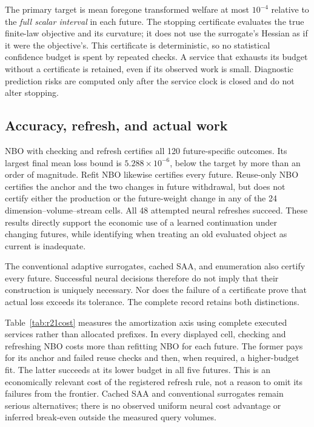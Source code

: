 The primary target is mean foregone transformed welfare at most $10^{-4}$
relative to the \emph{full scalar interval} in each future. The stopping
certificate evaluates the true finite-law objective and its curvature;
it does not use the surrogate's Hessian as if it were the objective's.
This certificate is deterministic, so no statistical confidence budget is
spent by repeated checks. A service that exhausts its budget without a
certificate is retained, even if its observed work is small. Diagnostic
prediction risks are computed only after the service clock is closed and
do not alter stopping.

\subsection{Accuracy, refresh, and actual work}

NBO with checking and refresh certifies all 120 future-specific outcomes.
Its largest final mean loss bound is $5.288\times10^{-6}$, below the target
by more than an order of magnitude. Refit NBO likewise certifies every
future. Reuse-only NBO certifies the anchor and the two changes in future
withdrawal, but does not certify either the production or the future-weight
change in any of the 24 dimension--volume--stream cells. All 48 attempted
neural refreshes succeed. These results directly support the economic
use of a learned continuation under changing futures, while identifying
when treating an old evaluated object as current is inadequate.

The conventional adaptive surrogates, cached SAA, and enumeration also
certify every future. Successful neural decisions therefore do not imply
that their construction is uniquely necessary. Nor does the failure of a
certificate prove that actual loss exceeds its tolerance. The complete
record retains both distinctions.


Table~\ref{tab:r21cost} measures the amortization axis using complete
executed services rather than allocated prefixes. In every displayed cell,
checking and refreshing NBO costs more than refitting NBO for each future.
The former pays for its anchor and failed reuse checks and then, when
required, a higher-budget fit. The latter succeeds at its lower budget in
all five futures. This is an economically relevant cost of the registered
refresh rule, not a reason to omit its failures from the frontier. Cached
SAA and conventional surrogates remain serious alternatives; there is no
observed uniform neural cost advantage or inferred break-even outside the
measured query volumes.

